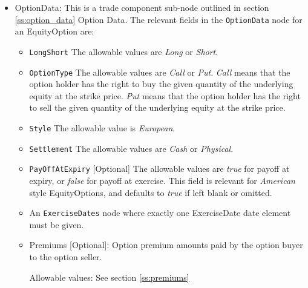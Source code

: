 \begin{itemize}
	\item OptionData: This is a trade component sub-node outlined in section \ref{ss:option_data} Option Data. The relevant fields in the \lstinline!OptionData! node for an EquityOption are:

	
	\begin{itemize}
	\item \lstinline!LongShort! The allowable values are \emph{Long} or \emph{Short}.

	\item \lstinline!OptionType! The allowable values are \emph{Call} or \emph{Put}.  \emph{Call} means that the option holder has the right to buy the given quantity of the underlying equity at the strike price.  \emph{Put} means that the option holder has the right to sell the given quantity of the underlying equity at the strike price. 
	
\item  \lstinline!Style! The allowable value is \emph{European}. 

\item  \lstinline!Settlement! The allowable values are \emph{Cash} or \emph{Physical}.

\item \lstinline!PayOffAtExpiry! [Optional] The allowable values are \emph{true} for payoff at expiry, or \emph{false} for payoff at exercise. This field is relevant for \emph{American} style EquityOptions, and defaults to \emph{true} if left blank or omitted. 

\item An \lstinline!ExerciseDates! node where exactly one ExerciseDate date element must be given. 

\item Premiums [Optional]: Option premium amounts paid by the option buyer to the option seller.

Allowable values:  See section \ref{ss:premiums}

\end{itemize}
	


\end{itemize}
